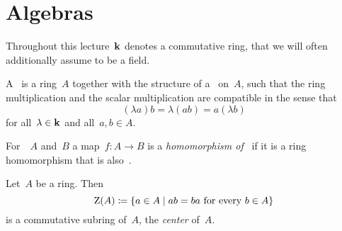 \section{Algebras}


\begin{conventionnonum}
  Throughout this lecture~$\kf$ denotes a commutative ring, that we will often additionally assume to be a field.
\end{conventionnonum}


\begin{definition}
  A~\emph{{\kalg}} is a ring~$A$ together with the structure of a~{\module{$\kf$}} on~$A$, such that the ring multiplication and the scalar multiplication are compatible in the sense that
  \begin{equation}
    \label{compatibility of multiplications}
      (\lambda a) b
    = \lambda (ab)
    = a (\lambda b)
  \end{equation}
  for all~$\lambda \in \mathbf{k}$ and all~$a, b \in A$.
\end{definition}


\begin{definition}
  For~{\kalgs}~$A$ and~$B$ a map~$f \colon A \to B$ is a \emph{homomorphism of~{\kalgs}} if it is a ring homomorphism that is also~{\klin}.
\end{definition}


\begin{remark}
  Let~$A$ be a ring.
  Then
  \[
              \ringcenter(A)
    \defined  \{
                a \in A
              \suchthat
                \text{$ab = ba$ for every~$b \in A$}
              \}
  \]
  is a commutative subring of~$A$, the \emph{center} of~$A$.
\end{remark}


